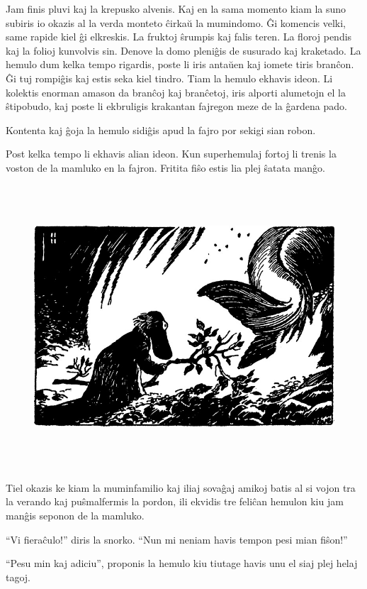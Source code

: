 Jam finis pluvi kaj la krepusko alvenis. Kaj en la sama momento kiam la suno subiris io okazis al la verda monteto ĉirkaŭ la mumindomo. Ĝi komencis velki, same rapide kiel ĝi elkreskis. La fruktoj ŝrumpis kaj falis teren. La floroj pendis kaj la folioj kunvolvis sin. Denove la domo pleniĝis de susurado kaj kraketado. La hemulo dum kelka tempo rigardis, poste li iris antaŭen kaj iomete tiris branĉon. Ĝi tuj rompiĝis kaj estis seka kiel tindro. Tiam la hemulo ekhavis ideon. Li kolektis enorman amason da branĉoj kaj branĉetoj, iris alporti alumetojn el la ŝtipobudo, kaj poste li ekbruligis krakantan fajregon meze de la ĝardena pado.

Kontenta kaj ĝoja la hemulo sidiĝis apud la fajro por sekigi sian robon.

Post kelka tempo li ekhavis alian ideon. Kun superhemulaj fortoj li trenis la voston de la mamluko en la fajron. Fritita fiŝo estis lia plej ŝatata manĝo.

\begin{figure}[htbp]
\centering
\includegraphics[width=450pt,height=299pt]{_28.jpg}
\caption{}
\label{_28}
\end{figure}

Tiel okazis ke kiam la muminfamilio kaj iliaj sovaĝaj amikoj batis al si vojon tra la verando kaj puŝmalfermis la pordon, ili ekvidis tre feliĉan hemulon kiu jam manĝis seponon de la mamluko.

``Vi fieraĉulo!'' diris la snorko. ``Nun mi neniam havis tempon pesi mian fiŝon!''

``Pesu min kaj adiciu'', proponis la hemulo kiu tiutage havis unu el siaj plej helaj tagoj.

